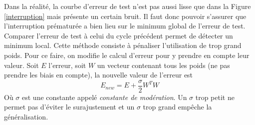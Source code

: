 Dans la réalité, la courbe d'erreur de test n'est pas aussi lisse que dans la Figure \ref{interruption} mais présente un certain bruit.
Il faut donc pouvoir s'assurer que l'interruption prématurée a bien lieu sur le minimum global de l'erreur de test.
Comparer l'erreur de test à celui du cycle précédent permet de détecter un minimum local.
Cette méthode consiste à pénaliser l'utilisation de trop grand poids.
Pour ce faire, on modifie le calcul d'erreur pour y prendre en compte leur valeur.\cite{statistica}
Soit $E$ l'erreur, soit $W$ un vecteur contenant tous les poids (ne pas prendre les biais en compte), la nouvelle valeur de l'erreur est \[E_{new} = E + \frac{\sigma}{2}W^{T}W\]
Où $\sigma$ est une constante appelé \emph{constante de modération}.
Un $\sigma$ trop petit ne permet pas d'éviter le surajustement et un $\sigma$ trop grand empêche la généralisation.
